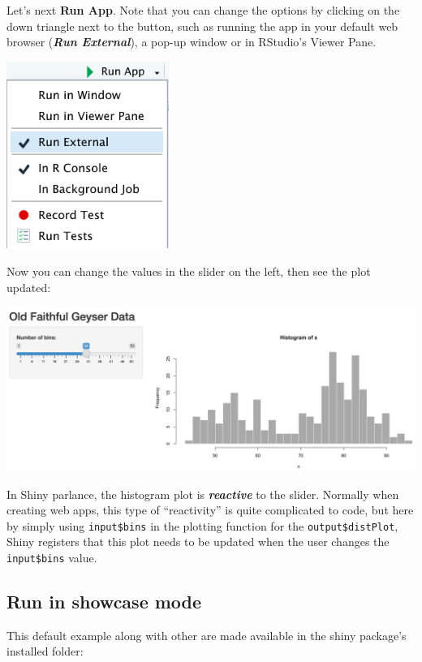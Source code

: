 \documentclass[
  letterpaper,
  DIV=11,
  numbers=noendperiod]{scrreprt}
\begin{document}
Let's next \textbf{Run App}. Note that you can change the options by
clicking on the down triangle next to the button, such as running the
app in your default web browser (\textbf{\emph{Run External}}), a pop-up
window or in RStudio's Viewer Pane.

\includegraphics[width=2.08333in,height=\textheight]{./figs/shiny/shiny-run-app-options.png}

Now you can change the values in the slider on the left, then see the
plot updated:

\includegraphics[width=6.25in,height=\textheight]{./figs/shiny/faithful-app.png}

In Shiny parlance, the histogram plot is \textbf{\emph{reactive}} to the
slider. Normally when creating web apps, this type of ``reactivity'' is
quite complicated to code, but here by simply using \texttt{input\$bins}
in the plotting function for the \texttt{output\$distPlot}, Shiny
registers that this plot needs to be updated when the user changes the
\texttt{input\$bins} value.

\hypertarget{run-in-showcase-mode}{%
\subsection{Run in showcase mode}\label{run-in-showcase-mode}}

This default example along with other are made available in the shiny
package's installed folder:
\end{document}
